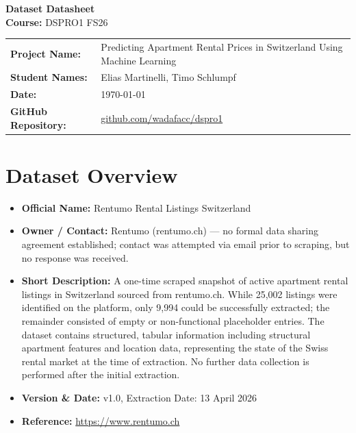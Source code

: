 \documentclass[11pt, a4paper]{article}
\begin{document}
\begin{center}
    {\huge \bfseries \color{primaryBlue} Dataset Datasheet} \\[0.2cm]
    {\large \textbf{Course:} DSPRO1 FS26} \\[0.1cm]
\end{center}

\vspace{0.4cm}

\begin{studentbox}
    \begin{tabularx}{\textwidth}{l X}
        \textbf{Project Name:} & Predicting Apartment Rental Prices in Switzerland Using Machine Learning \\
        \textbf{Student Names:} & Elias Martinelli, Timo Schlumpf \\
        \textbf{Date:} & \today \\
        \textbf{GitHub Repository:} & \url{github.com/wadafacc/dspro1} \\
    \end{tabularx}
\end{studentbox}

\vspace{0.5cm}

\section{Dataset Overview}
\begin{itemize}
    \item \textbf{Official Name:} Rentumo Rental Listings Switzerland
    \item \textbf{Owner / Contact:} Rentumo (rentumo.ch) --- no formal data sharing agreement established; contact was attempted via email prior to scraping, but no response was received.
    \item \textbf{Short Description:} A one-time scraped snapshot of active apartment rental listings in Switzerland sourced from rentumo.ch. While 25{,}002 listings were identified on the platform, only 9{,}994 could be successfully extracted; the remainder consisted of empty or non-functional placeholder entries. The dataset contains structured, tabular information including structural apartment features and location data, representing the state of the Swiss rental market at the time of extraction. No further data collection is performed after the initial extraction.
    \item \textbf{Version \& Date:} v1.0, Extraction Date: 13 April 2026
    \item \textbf{Reference:} \url{https://www.rentumo.ch}
\end{itemize}
\end{document}
